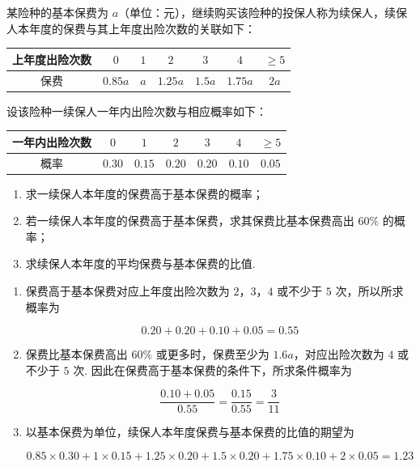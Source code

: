 \begin{problem}
某险种的基本保费为 \(a\)（单位：元），继续购买该险种的投保人称为续保人，续保人本年度的保费与其上年度出险次数的关联如下：

\begin{center}
\begin{tabular}{c|cccccc}
上年度出险次数 & \(0\) & \(1\) & \(2\) & \(3\) & \(4\) & \(\geq 5\)\\
\hline
保费 & \(0.85a\) & \(a\) & \(1.25a\) & \(1.5a\) & \(1.75a\) & \(2a\)
\end{tabular}
\end{center}

设该险种一续保人一年内出险次数与相应概率如下：

\begin{center}
\begin{tabular}{c|cccccc}
一年内出险次数 & \(0\) & \(1\) & \(2\) & \(3\) & \(4\) & \(\geq 5\)\\
\hline
概率 & \(0.30\) & \(0.15\) & \(0.20\) & \(0.20\) & \(0.10\) & \(0.05\)
\end{tabular}
\end{center}

\begin{enumerate}
\item 求一续保人本年度的保费高于基本保费的概率；
\item 若一续保人本年度的保费高于基本保费，求其保费比基本保费高出 \(60\%\) 的概率；
\item 求续保人本年度的平均保费与基本保费的比值.
\end{enumerate}
\end{problem}

\begin{solution}
\begin{enumerate}
\item 保费高于基本保费对应上年度出险次数为 \(2\)，\(3\)，\(4\) 或不少于 \(5\) 次，所以所求概率为

\[
0.20+0.20+0.10+0.05=0.55
\]

\item 保费比基本保费高出 \(60\%\) 或更多时，保费至少为 \(1.6a\)，对应出险次数为 \(4\) 或不少于 \(5\) 次. 因此在保费高于基本保费的条件下，所求条件概率为

\[
\frac{0.10+0.05}{0.55}=\frac{0.15}{0.55}=\frac3{11}
\]

\item 以基本保费为单位，续保人本年度保费与基本保费的比值的期望为

\[
0.85\times0.30+1\times0.15+1.25\times0.20+1.5\times0.20+1.75\times0.10+2\times0.05=1.23
\]
\end{enumerate}
\end{solution}


